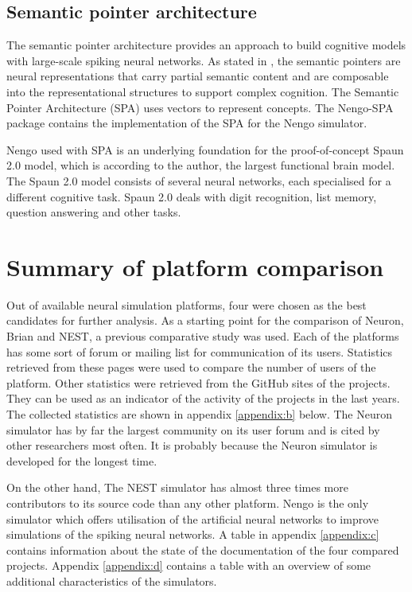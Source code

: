 \subsection{Semantic pointer architecture}
The semantic pointer architecture provides an approach to build cognitive models with large-scale spiking neural networks. As stated in \cite{eliasmithHowBuild13}, the semantic pointers are neural representations that carry partial semantic content and are composable into the representational structures to support complex cognition. The Semantic Pointer Architecture (SPA) uses vectors to represent concepts. The Nengo-SPA package contains the implementation of the SPA for the Nengo simulator. \par
Nengo used with SPA is an underlying foundation for the proof-of-concept Spaun 2.0 \cite{chooSpaunExtending18} model, which is according to the author, the largest functional brain model. The Spaun 2.0 model consists of several neural networks, each specialised for a different cognitive task. Spaun 2.0 deals with digit recognition, list memory, question answering and other tasks.

\section{Summary of platform comparison}
Out of available neural simulation platforms, four were chosen as the best candidates for further analysis. As a starting point for the comparison of Neuron, Brian and NEST, a previous comparative study \cite{tikidji-hamburyanSoftwareBrainNetwork2017} was used. Each of the platforms has some sort of forum or mailing list for communication of its users. Statistics retrieved from these pages were used to compare the number of users of the platform. Other statistics were retrieved from the GitHub sites of the projects. They can be used as an indicator of the activity of the projects in the last years. The collected statistics are shown in appendix \ref{appendix:b} below. The Neuron simulator has by far the largest community on its user forum and is cited by other researchers most often. It is probably because the Neuron simulator is developed for the longest time. \par
On the other hand, The NEST simulator has almost three times more contributors to its source code than any other platform. Nengo is the only simulator which offers utilisation of the artificial neural networks to improve simulations of the spiking neural networks. A table in appendix \ref{appendix:c} contains information about the state of the documentation of the four compared projects. Appendix \ref{appendix:d} contains a table with an overview of some additional characteristics of the simulators.